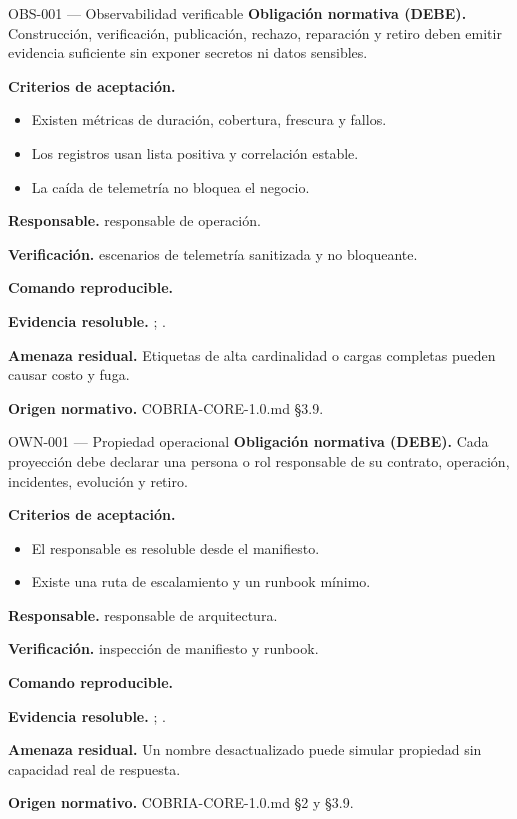 \begin{requisito}{OBS-001 --- Observabilidad verificable}
\textbf{Obligación normativa (DEBE).} Construcción, verificación, publicación, rechazo, reparación y retiro deben emitir evidencia suficiente sin exponer secretos ni datos sensibles.\par
\textbf{Criterios de aceptación.}
\begin{itemize}
\item Existen métricas de duración, cobertura, frescura y fallos.
\item Los registros usan lista positiva y correlación estable.
\item La caída de telemetría no bloquea el negocio.
\end{itemize}
\textbf{Responsable.} responsable de operación.\par
\textbf{Verificación.} escenarios de telemetría sanitizada y no bloqueante.\par
\textbf{Comando reproducible.} \texttt{}\par
\textbf{Evidencia resoluble.} ; .\par
\textbf{Amenaza residual.} Etiquetas de alta cardinalidad o cargas completas pueden causar costo y fuga.\par
\textbf{Origen normativo.} COBRIA-CORE-1.0.md §3.9.
\end{requisito}
\begin{requisito}{OWN-001 --- Propiedad operacional}
\textbf{Obligación normativa (DEBE).} Cada proyección debe declarar una persona o rol responsable de su contrato, operación, incidentes, evolución y retiro.\par
\textbf{Criterios de aceptación.}
\begin{itemize}
\item El responsable es resoluble desde el manifiesto.
\item Existe una ruta de escalamiento y un runbook mínimo.
\end{itemize}
\textbf{Responsable.} responsable de arquitectura.\par
\textbf{Verificación.} inspección de manifiesto y runbook.\par
\textbf{Comando reproducible.} \texttt{}\par
\textbf{Evidencia resoluble.} ; .\par
\textbf{Amenaza residual.} Un nombre desactualizado puede simular propiedad sin capacidad real de respuesta.\par
\textbf{Origen normativo.} COBRIA-CORE-1.0.md §2 y §3.9.
\end{requisito}
